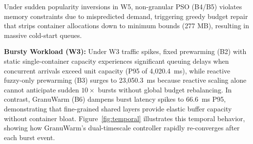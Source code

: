 \documentclass[final,5p,times,twocolumn]{elsarticle}
\begin{document}
\begin{table}[htbp]
\centering
\caption{Cold-Start Rate (\%) by Workload Regime}
\label{tab:csr_workload}
\end{table}

\begin{table}[htbp]
\centering
\caption{Average Memory Footprint (MB) by Workload Regime}
\label{tab:mem_workload}
\end{table}

Under sudden popularity inversions in W5, non-granular PSO (B4/B5) violates memory constraints due to mispredicted demand, triggering greedy budget repair that strips container allocations down to minimum bounds (277 MB), resulting in massive cold-start queues.

\textbf{Bursty Workload (W3):} Under W3 traffic spikes, fixed prewarming (B2) with static single-container capacity experiences significant queuing delays when concurrent arrivals exceed unit capacity (P95 of 4,020.4~ms), while reactive fuzzy-only prewarming (B3) surges to 23,050.3~ms because reactive scaling alone cannot anticipate sudden $10\times$ bursts without global budget rebalancing. In contrast, GranuWarm (B6) dampens burst latency spikes to 66.6~ms P95, demonstrating that fine-grained shared layers provide elastic buffer capacity without container bloat. Figure~\ref{fig:temporal} illustrates this temporal behavior, showing how GranuWarm's dual-timescale controller rapidly re-converges after each burst event.
\end{document}
